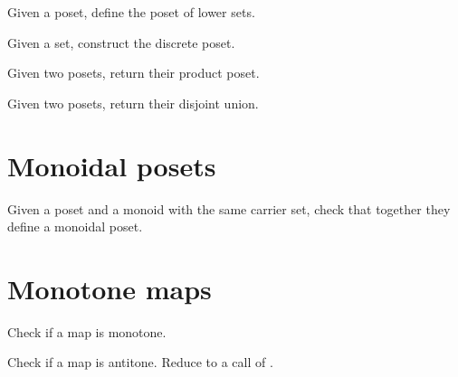 \begin{exercise}
  Given a poset, define the poset of lower sets.
\end{exercise}


\begin{exercise}
  Given a set, construct the discrete poset.

\end{exercise}


\begin{exercise}
  Given two posets, return their product poset.
\end{exercise}
\begin{exercise}
  Given two posets, return their disjoint union.

\end{exercise}


\section{Monoidal posets}



\begin{exercise}
  Given a poset and a monoid with the same carrier set, check that together they define a monoidal poset.

\end{exercise}


\section{Monotone maps}




\begin{exercise}
  Check if a map is monotone.

\end{exercise}


\begin{exercise}
  Check if a map is antitone. Reduce to a call of .

\end{exercise}


